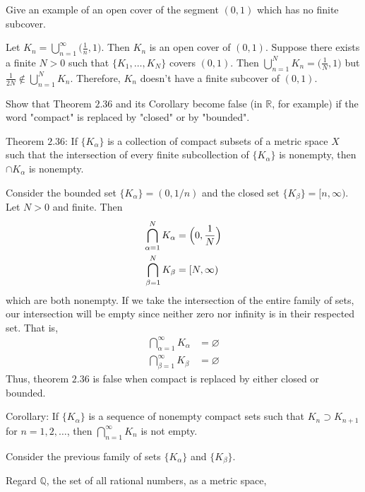 \begin{exercise}
\item
  Give an example of an open cover of the segment \((0,1)\) which has no
  finite subcover.
  \par\smallskip
  Let \(K_n = \bigcup_{n = 1}^{\infty}\bigl(\frac{1}{n},1\bigr)\).
  Then \(K_n\) is an open cover of \((0,1)\).
  Suppose there exists a finite \(N > 0\) such that \(\{K_1,\ldots,K_N\}\)
  covers \((0,1)\).
  Then \(\bigcup_{n = 1}^NK_n = \bigl(\frac{1}{N},1\bigr)\) but
  \(\frac{1}{2N}\notin\bigcup_{n = 1}^NK_n\).
  Therefore, \(K_n\) doesn't have a finite subcover of \((0,1)\).
\item
  Show that Theorem \(2.36\) and its Corollary become false (in \(\mathbb{R}\),
  for example) if the word "compact" is replaced by "closed" or by "bounded".
  \par\smallskip
  Theorem \(2.36\): If \(\{K_{\alpha}\}\) is a collection of compact subsets of
  a metric space \(X\) such that the intersection of every finite subcollection
  of \(\{K_{\alpha}\}\) is nonempty, then \(\cap K_{\alpha}\) is nonempty.
  \par\smallskip
  Consider the bounded set \(\{K_{\alpha}\} = (0,1/n)\) and the closed set
  \(\{K_{\beta}\} = [n,\infty)\).
  Let \(N > 0\) and finite.
  Then
  \begin{align*}
    \bigcap_{\alpha = 1}^NK_{\alpha} & = \Bigl(0, \frac{1}{N}\Bigr)\\
    \bigcap_{\beta = 1}^NK_{\beta} & = [N, \infty)
  \end{align*}
  which are both nonempty.
  If we take the intersection of the entire family of sets, our intersection
  will be empty since neither zero nor infinity is in their respected set.
  That is,
  \begin{align*}
    \bigcap_{\alpha = 1}^{\infty}K_{\alpha} & = \varnothing\\
    \bigcap_{\beta = 1}^{\infty}K_{\beta} & = \varnothing
  \end{align*}
  Thus, theorem \(2.36\) is false when compact is replaced by either closed or
  bounded.
  \par\smallskip
  Corollary: If \(\{K_{\alpha}\}\) is a sequence of nonempty compact sets such
  that \(K_n\supset K_{n + 1}\) for \(n=1,2,\ldots\), then
  \(\bigcap_{n = 1}^{\infty}K_n\) is not empty.
  \par\smallskip
  Consider the previous family of sets \(\{K_{\alpha}\}\) and
  \(\{K_{\beta}\}\).
\item
  Regard \(\mathbb{Q}\), the set of all rational numbers, as a metric space,

\end{exercise}
